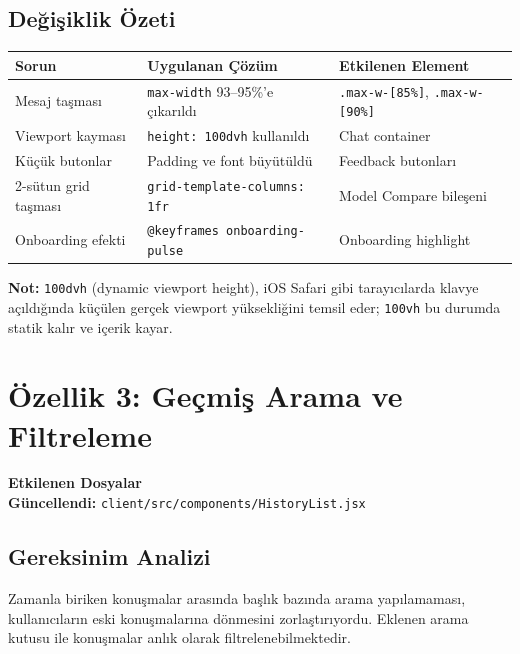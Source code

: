 \documentclass[12pt,a4paper]{article}
\newenvironment{featurebox}[1]{%
  \begin{mdframed}[
    backgroundcolor=bgweek,
    linecolor=borderpurple,
    linewidth=0.8pt,
    innerleftmargin=8pt,
    innerrightmargin=8pt,
    innertopmargin=6pt,
    innerbottommargin=6pt,
    roundcorner=4pt
  ]
  \raggedright
  \noindent\textbf{\small #1}\\[4pt]
}{%
  \end{mdframed}
}
\newenvironment{notebox}{%
  \begin{mdframed}[
    backgroundcolor=infoblue!8,
    linecolor=infoblue!60,
    linewidth=0.6pt,
    innerleftmargin=8pt,
    innerrightmargin=8pt,
    innertopmargin=5pt,
    innerbottommargin=5pt,
    roundcorner=4pt
  ]
}{%
  \end{mdframed}
}\geometry{margin=2.5cm}
\begin{document}
\subsection{Değişiklik Özeti}

\begin{tabularx}{\textwidth}{lXl}
\toprule
\textbf{Sorun} & \textbf{Uygulanan Çözüm} & \textbf{Etkilenen Element} \\
\midrule
Mesaj taşması        & \texttt{max-width} 93–95\%'e çıkarıldı    & \texttt{.max-w-{[}85\%{]}}, \texttt{.max-w-{[}90\%{]}} \\
Viewport kayması     & \texttt{height: 100dvh} kullanıldı         & Chat container \\
Küçük butonlar       & Padding ve font büyütüldü                 & Feedback butonları \\
2-sütun grid taşması & \texttt{grid-template-columns: 1fr}        & Model Compare bileşeni \\
Onboarding efekti    & \texttt{@keyframes onboarding-pulse}       & Onboarding highlight \\
\bottomrule
\end{tabularx}

\begin{notebox}
\textbf{Not:} \texttt{100dvh} (dynamic viewport height), iOS Safari gibi tarayıcılarda klavye açıldığında küçülen gerçek viewport yüksekliğini temsil eder; \texttt{100vh} bu durumda statik kalır ve içerik kayar.
\end{notebox}

\newpage

\section{Özellik 3: Geçmiş Arama ve Filtreleme}

\begin{featurebox}{Etkilenen Dosyalar}
\textbf{Güncellendi:} \texttt{client/src/components/HistoryList.jsx}
\end{featurebox}

\subsection{Gereksinim Analizi}
Zamanla biriken konuşmalar arasında başlık bazında arama yapılamaması, kullanıcıların eski konuşmalarına dönmesini zorlaştırıyordu. Eklenen arama kutusu ile konuşmalar anlık olarak filtrelenebilmektedir.
\end{document}

